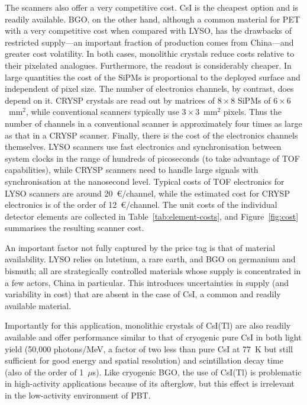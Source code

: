 \documentclass[11pt]{article}
\begin{document}
 
 The scanners also offer a very competitive cost. CsI is the cheapest option and is readily available. BGO, on the other hand, although a common material for PET with a very competitive cost when compared with LYSO, has the drawbacks of restricted supply---an important fraction of production comes from China---and greater cost volatility. In both cases, monolithic crystals reduce costs relative to their pixelated analogues. Furthermore, the readout is considerably cheaper. In large quantities the cost of the SiPMs is proportional to the deployed surface and independent of pixel size. The number of electronics channels, by contrast, does depend on it. CRYSP crystals are read out by matrices of $8 \times 8$ SiPMs of $6 \times 6$~mm$^2$, while conventional scanners typically use $3 \times 3$~mm$^2$ pixels. Thus the number of channels in a conventional scanner is approximately four times as large as that in a CRYSP scanner. Finally, there is the cost of the electronics channels themselves. LYSO scanners use fast electronics and synchronisation between system clocks in the range of hundreds of picoseconds (to take advantage of TOF capabilities), while CRYSP scanners need to handle large signals with synchronisation at the nanosecond level. Typical costs of TOF electronics for LYSO scanners are around 20~\euro/channel, while the estimated cost for CRYSP electronics is of the order of 12~\euro/channel. The unit costs of the individual detector elements are collected in Table~\ref{tab:element-costs}, and Figure~\ref{fig:cost} summarises the resulting scanner cost.
 
An important factor not fully captured by the price tag is that of material availability. LYSO relies on lutetium, a rare earth, and BGO on germanium and bismuth; all are strategically controlled materials whose supply is concentrated in a few actors, China in particular. This introduces uncertainties in supply (and variability in cost) that are absent in the case of CsI, a common and readily available material. 

Importantly for this application, monolithic crystals of CsI(Tl) are also readily available and offer performance similar to that of cryogenic pure CsI in both light yield (50,000 photons/MeV, a factor of two less than pure CsI at 77~K but still sufficient for good energy and spatial resolution) and scintillation decay time (also of the order of 1~$\mu$s). Like cryogenic BGO, the use of CsI(Tl) is problematic in high-activity applications because of its afterglow, but this effect is irrelevant in the low-activity environment of PBT. 
 
\end{document}
